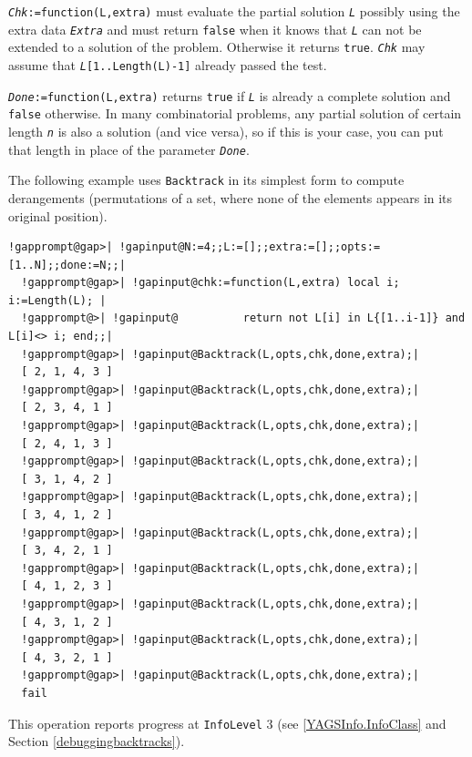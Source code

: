 \documentclass[a4paper,11pt]{report}
\begin{document}
{{{\mbox{\texttt{\mdseries\slshape Chk}}\texttt{:=function(L,extra)} must evaluate the partial solution \mbox{\texttt{\mdseries\slshape L}} possibly using the extra data \mbox{\texttt{\mdseries\slshape Extra}} and must return \texttt{false} when it knows that \mbox{\texttt{\mdseries\slshape L}} can not be extended to a solution of the problem. Otherwise it returns \texttt{true}. \mbox{\texttt{\mdseries\slshape Chk}} may assume that \mbox{\texttt{\mdseries\slshape L}}\texttt{\texttt{}[1..Length(L)-1]\texttt{}} already passed the test. 

\mbox{\texttt{\mdseries\slshape Done}}\texttt{:=function(L,extra)} returns \texttt{true} if \mbox{\texttt{\mdseries\slshape L}} is already a complete solution and \texttt{false} otherwise. In many combinatorial problems, any partial solution of certain
length \mbox{\texttt{\mdseries\slshape n}} is also a solution (and vice versa), so if this is your case, you can put that
length in place of the parameter \mbox{\texttt{\mdseries\slshape Done}}. 

The following example uses \texttt{Backtrack} in its simplest form to compute derangements (permutations of a set, where none of the elements appears in its original
position). 


\begin{Verbatim}[commandchars=!@|,fontsize=\small,frame=single,label=Example]
  !gapprompt@gap>| !gapinput@N:=4;;L:=[];;extra:=[];;opts:=[1..N];;done:=N;;|
  !gapprompt@gap>| !gapinput@chk:=function(L,extra) local i; i:=Length(L); |
  !gapprompt@>| !gapinput@          return not L[i] in L{[1..i-1]} and L[i]<> i; end;;|
  !gapprompt@gap>| !gapinput@Backtrack(L,opts,chk,done,extra);|
  [ 2, 1, 4, 3 ]
  !gapprompt@gap>| !gapinput@Backtrack(L,opts,chk,done,extra);|
  [ 2, 3, 4, 1 ]
  !gapprompt@gap>| !gapinput@Backtrack(L,opts,chk,done,extra);|
  [ 2, 4, 1, 3 ]
  !gapprompt@gap>| !gapinput@Backtrack(L,opts,chk,done,extra);|
  [ 3, 1, 4, 2 ]
  !gapprompt@gap>| !gapinput@Backtrack(L,opts,chk,done,extra);|
  [ 3, 4, 1, 2 ]
  !gapprompt@gap>| !gapinput@Backtrack(L,opts,chk,done,extra);|
  [ 3, 4, 2, 1 ]
  !gapprompt@gap>| !gapinput@Backtrack(L,opts,chk,done,extra);|
  [ 4, 1, 2, 3 ]
  !gapprompt@gap>| !gapinput@Backtrack(L,opts,chk,done,extra);|
  [ 4, 3, 1, 2 ]
  !gapprompt@gap>| !gapinput@Backtrack(L,opts,chk,done,extra);|
  [ 4, 3, 2, 1 ]
  !gapprompt@gap>| !gapinput@Backtrack(L,opts,chk,done,extra);|
  fail
\end{Verbatim}
 

This operation reports progress at \texttt{InfoLevel} 3 (see \ref{YAGSInfo.InfoClass} and Section \ref{debuggingbacktracks}). 

}}}
\end{document}

